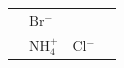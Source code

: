 \begin{enumerate}[noitemsep, label=\textbf{\arabic*}. ]
{\begin{tabular}[t]{|l|l|l|l|}
    
         &
    
    
        \begin{math}\mathrm{Br}{}^{-}\end{math} &
    
    
     \tabularnewline\cline{1-1}\cline{2-2}\cline{3-3}\cline{4-4}
    
    
         &
    
    
        \begin{math}\mathrm{NH}_{4}^{+}\end{math} &
    
    
        \begin{math}\mathrm{Cl}{}^{-}\end{math} &
    
    
     \tabularnewline\cline{1-1}\cline{2-2}\cline{3-3}\cline{4-4}
    

\end{tabular}}
\end{enumerate}
